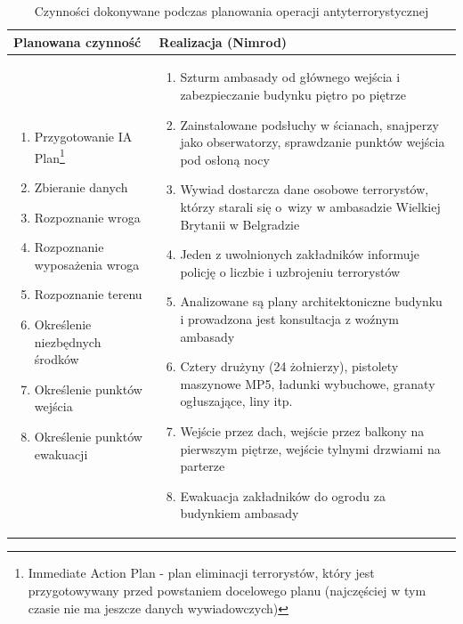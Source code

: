 \begin{table}
\begin{center}
\begin{tabular}{p{} p{}}
Planowana czynność & Realizacja (Nimrod)\\\hline
	\begin{enumerate}
		\setlength\itemsep{0pt}
		\item Przygotowanie IA Plan\footnote{Immediate Action Plan - plan eliminacji terrorystów, który jest przygotowywany przed powstaniem docelowego planu (najczęściej w tym czasie nie ma jeszcze danych wywiadowczych)}
		\item Zbieranie danych
		\item Rozpoznanie wroga
		\item Rozpoznanie wyposażenia wroga
		\item Rozpoznanie terenu
		\item Określenie niezbędnych środków 
		\item Określenie punktów wejścia
		\item Określenie punktów ewakuacji		
	\end{enumerate}&\begin{enumerate}
		\setlength\itemsep{0pt}
		\item Szturm ambasady od głównego wejścia i zabezpieczanie budynku piętro po piętrze
		\item Zainstalowane podsłuchy w ścianach, snajperzy jako obserwatorzy, sprawdzanie punktów wejścia pod osłoną nocy
		\item Wywiad dostarcza dane osobowe terrorystów, którzy starali się o~wizy w ambasadzie Wielkiej Brytanii w Belgradzie
		\item Jeden z uwolnionych zakładników informuje policję o liczbie i uzbrojeniu terrorystów
		\item Analizowane są plany architektoniczne budynku i prowadzona jest konsultacja z woźnym ambasady
		\item Cztery drużyny (24 żołnierzy), pistolety maszynowe MP5, ładunki wybuchowe, granaty ogłuszające, liny itp.
		\item Wejście przez dach, wejście przez balkony na pierwszym piętrze, wejście tylnymi drzwiami na parterze
		\item Ewakuacja zakładników do ogrodu za budynkiem ambasady
	\end{enumerate}
\end{tabular}
\caption {Czynności dokonywane podczas planowania operacji antyterrorystycznej\label{realPlan}}
\end{center}
\end{table} 


